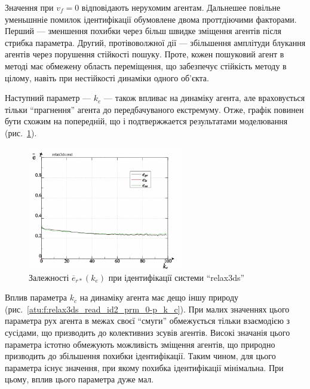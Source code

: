 Значення при
$ v_f = 0 $ відповідають нерухомим агентам. Дальнешее повільне
уменьшнніе помилок ідентифікації обумовлене двома
проттдіючими факторами. Перший --- зменшення похибки через
більш швидке зміщення агентів після стрибка параметра. Другий,
протівоволжної дії --- збільшення амплітуди блукання агентів
через порушення стійкості пошуку. Проте, кожен пошуковий агент
в методі має обмежену область переміщення, що
забезпечує стійкість методу в цілому, навіть при нестійкості
динаміки одного об'єкта.

Наступний параметр ---
$ k_e $ --- також впливає на динаміку агента, але враховується
тільки ``прагнення'' агента до передбачуваного екстремуму. Отже,
графік повинен бути схожим на попередній, що і подтвержжается
результатами моделювання (рис.~\ref{atu:f:relax3ds_read_id2_prm_0-p_k_e}).

\begin{figure}[htb!]
  \centerline{\includegraphics[width=0.6\textwidth]{p/relax3ds_read_id2_prm_0-p_k_e.png} }
  \caption{Залежності $ \overline{e}_{r *} (k_e) $ при ідентифікації системи ``relax3ds''}
  \label{atu:f:relax3ds_read_id2_prm_0-p_k_e}
\end{figure}

Вплив параметра
$ k_c $ на динаміку агента має дещо іншу природу
(рис.~\ref{atu:f:relax3ds_read_id2_prm_0-p_k_c}). При малих значеннях цього параметра
рух агента в межах своєї ``смуги'' обмежується тільки взаємодією
з сусідами, що призводить до колективниз зсувів агентів. Високі
значанія цього параметра істотно обмежують можливість
зміщення агентів, що природно призводить до збільшення похибки
ідентифікації. Таким чином, для цього параметра існує значення,
при якому похибка ідентифікації мінімальна. При цьому,
вплив цього параметра дуже мал.

